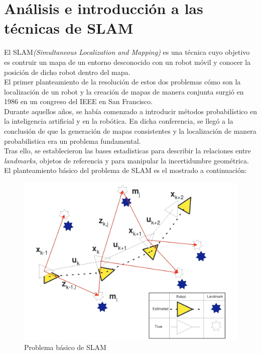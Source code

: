\section{Análisis e introducción a las técnicas de SLAM}
El SLAM\textit{(Simultaneous Localization and Mapping)} es una técnica cuyo objetivo es contruir un mapa de un entorno desconocido con un robot móvil 
y conocer la posición de dicho robot dentro del mapa. \\
El primer planteamiento de la resolución de estos dos problemas cómo son la localización de un robot y la creación de mapas de manera conjunta surgió 
en 1986 en un congreso del IEEE en San Francisco. \\
Durante aquellos años, se había comenzado a introducir métodos probabilístico en la inteligencia artificial 
y en la robótica. En dicha conferencia, se llegó a la conclusión de que la generación de mapas consistentes y la localización de manera probabilistica era
un problema fundamental.\\

Tras ello, se establecieron las bases estadisticas para describir la relaciones entre \textit{landmarks}, objetos de referencia y 
para manipular la incertidumbre geométrica. \\
El planteamiento básico del problema de SLAM es el mostrado a continuación:
\begin{figure}[h!]
    \centering
    \includegraphics[width=.6\textwidth]{images/slam_prob}
    \caption{Problema básico de SLAM}
\end{figure}

